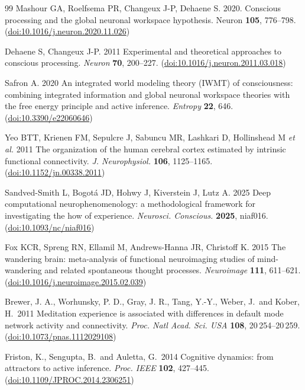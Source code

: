 \documentclass[openacc]{rsproca_new}%
\begin{document}
\begin{thebibliography}{99}
Mashour GA, Roelfsema PR, Changeux J-P, Dehaene S. 2020. Conscious processing and the global neuronal workspace hypothesis. Neuron \textbf{105}, 776--798. (\href{https://doi.org/10.1016/j.neuron.2020.01.026}{doi:10.1016/j.neuron.2020.11.026})

Dehaene S, Changeux J-P. 2011 Experimental and theoretical approaches to conscious processing. \textit{Neuron} \textbf{70}, 200--227. (\href{https://doi.org/10.1016/j.neuron.2011.03.018}{doi:10.1016/j.neuron.2011.03.018})

Safron A. 2020 An integrated world modeling theory (IWMT) of consciousness: combining integrated information and global neuronal workspace theories with the free energy principle and active inference. \textit{Entropy} \textbf{22}, 646. (\href{https://doi.org/10.3390/e22060646}{doi:10.3390/e22060646})

Yeo BTT, Krienen FM, Sepulcre J, Sabuncu MR, Lashkari D, Hollinshead M \textit{et al.} 2011 The organization of the human cerebral cortex estimated by intrinsic functional connectivity. \textit{J. Neurophysiol.} \textbf{106}, 1125--1165. (\href{https://doi.org/10.1152/jn.00338.2011}{doi:10.1152/jn.00338.2011})

Sandved-Smith L, Bogotá JD, Hohwy J, Kiverstein J, Lutz A. 2025 Deep computational neurophenomenology: a methodological framework for investigating the how of experience. \textit{Neurosci. Conscious.} \textbf{2025}, niaf016. (\href{https://doi.org/10.1093/nc/niaf016}{doi:10.1093/nc/niaf016})

Fox KCR, Spreng RN, Ellamil M, Andrews-Hanna JR, Christoff K. 2015 The wandering brain: meta-analysis of functional neuroimaging studies of mind-wandering and related spontaneous thought processes. \textit{Neuroimage} \textbf{111}, 611--621. (\href{https://doi.org/10.1016/j.neuroimage.2015.02.039}{doi:10.1016/j.neuroimage.2015.02.039})

Brewer, J. A., Worhunsky, P. D., Gray, J. R., Tang, Y.-Y., Weber, J.\ and Kober, H.\ 2011 Meditation experience is associated with differences in default mode network activity and connectivity. \textit{Proc. Natl Acad. Sci. USA} \textbf{108}, 20\,254--20\,259. (\href{https://doi.org/10.1073/pnas.1112029108}{doi:10.1073/pnas.1112029108})

Friston, K., Sengupta, B.\ and Auletta, G.\ 2014 Cognitive dynamics: from attractors to active inference. \textit{Proc. IEEE} \textbf{102}, 427--445. (\href{https://doi.org/10.1109/JPROC.2014.2306251}{doi:10.1109/JPROC.2014.2306251})


\end{thebibliography}
\end{document}
